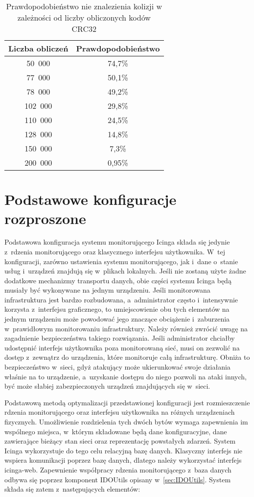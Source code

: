 \begin{table}
\centering
\caption{Prawdopodobieństwo nie znalezienia kolizji w zależności od
  liczby obliczonych kodów CRC32}
\label{tab:CRC32Colisions}
\begin{tabular}{|c|c|}
\hline
Liczba obliczeń & Prawdopodobieństwo \\
\hline
50~000 & 74,7\% \\
\hline
77~000 & 50,1\% \\
\hline
78~000 & 49,2\% \\
\hline
102~000 & 29,8\% \\
\hline
110~000 & 24,5\% \\
\hline
128~000 & 14,8\% \\
\hline
150~000 & 7,3\% \\
\hline
200~000 & 0,95\% \\
\hline
\end{tabular}
\end{table} 

\section[Konfiguracje rozproszone][Podstawowe konfiguracje rozproszone]{Podstawowe konfiguracje rozproszone}

Podstawowa konfiguracja systemu monitorującego Icinga składa się
jedynie z~rdzenia monitorującego oraz klasycznego interfejsu
użytkownika. W~tej konfiguracji, zarówno ustawienia systemu
monitorującego, jak i~dane o~stanie usług i~urządzeń znajdują się
w~plikach lokalnych. Jeśli nie zostaną użyte żadne dodatkowe
mechanizmy transportu danych, obie części systemu Icinga będą musiały
być wykonywane na jednym urządzeniu. Jeśli monitorowana infrastruktura
jest bardzo rozbudowana, a~administrator często i~intensywnie korzysta
z~interfejsu graficznego, to umiejscowienie obu tych elementów na
jednym urządzeniu może powodować jego znaczące obciążenie i~zaburzenia
w~prawidłowym monitorowaniu infrastruktury. Należy również zwrócić
uwagę na zagadnienie bezpieczeństwa takiego rozwiązania. Jeśli
administrator chciałby udostępnić interfejs użytkownika poza
monitorowaną sieć, musi on zezwolić na dostęp z~zewnątrz do
urządzenia, które monitoruje całą infrastrukturę. Obniża to
bezpieczeństwo w~sieci, gdyż atakujący może ukierunkować swoje
działania właśnie na to urządzenie, a~uzyskanie dostępu do niego
pozwoli na ataki innych, być może słabiej zabezpieczonych urządzeń
znajdujących się w~sieci.

Podstawową metodą optymalizacji przedstawionej konfiguracji jest
rozmieszczenie rdzenia monitorującego oraz interfejsu użytkownika na
różnych urządzeniach fizycznych. Umożliwienie rozdzielenia tych dwóch
bytów wymaga zapewnienia im wspólnego miejsca, w~którym składowane
będą dane konfiguracyjne, dane zawierające bieżący stan sieci oraz
reprezentację powstałych zdarzeń. System Icinga wykorzystuje do tego
celu relacyjną bazę danych. Klasyczny interfejs nie wspiera
komunikacji poprzez bazę danych, dlatego należy wykorzystać interfejs
icinga-web. Zapewnienie współpracy rdzenia monitorującego z~baza
danych odbywa się poprzez komponent IDOUtils opisany
w~\ref{sec:IDOUtils}. System składa się zatem z~następujących
elementów:

